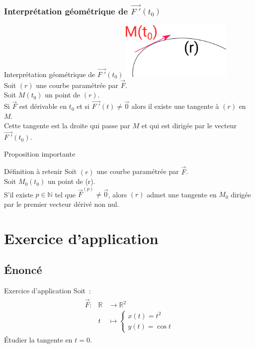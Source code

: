\documentclass[14pt]{beamer}
\begin{document}
\subsubsection{Interprétation géométrique de $\vec{F\;'}(t_0)$}
\begin{frame}{Interprétation géométrique de $\vec{F\;'}(t_0)$}
        \includegraphics[width=0.4\textwidth]{images/tangente.png}\\
        Soit $(r)$ une courbe paramétrée par $\vec{F}$.\\
        Soit $M(t_0)$ un point de $(r)$.\\
        Si $\vec{F}$ est dérivable en $t_0$ et si $\vec{F\;'}(t)\ne\vec{0}$
        alors il existe une tangente à $(r)$ en $M$.\\
        Cette tangente est la droite qui passe par $M$ et qui est dirigée
        par le vecteur $\vec{F\;'}(t_0)$.
\end{frame}
\begin{frame}{Proposition importante}
        \begin{alertblock}{Définition à retenir}
                Soit $(r)$ une courbe paramétrée par $\vec{F}$.\\
                Soit $M_0(t_0)$ un point de (r).\\
                S'il existe $p\in\mathbb{N}$ tel que $\vec{F}^{(p)}\ne\vec{0}$,
                alors $(r)$ admet une tangente en $M_0$ dirigée par le premier
                vecteur dérivé non nul.
        \end{alertblock}
\end{frame}

\section{Exercice d'application}
\subsection{Énoncé}
\begin{frame}
        \begin{exampleblock}{Exercice d'application}
        Soit~:
        \begin{align*}
                \begin{array}{lll}
                        \vec{F}: & \mathbb{R} &\to \mathbb{R}^2\\
                        & t &\mapsto \left\{\begin{array}{l}x(t)=t^2\\y(t)=\cos t\end{array}\right.
                \end{array}
        \end{align*}
        Étudier la tangente en $t=0$.
        \end{exampleblock}
\end{frame}
\end{document}
